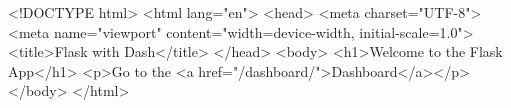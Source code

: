 <!DOCTYPE html>
<html lang="en">
<head>
    <meta charset="UTF-8">
    <meta name="viewport" content="width=device-width, initial-scale=1.0">
    <title>Flask with Dash</title>
</head>
<body>
    <h1>Welcome to the Flask App</h1>
    <p>Go to the <a href="/dashboard/">Dashboard</a></p>
</body>
</html>
